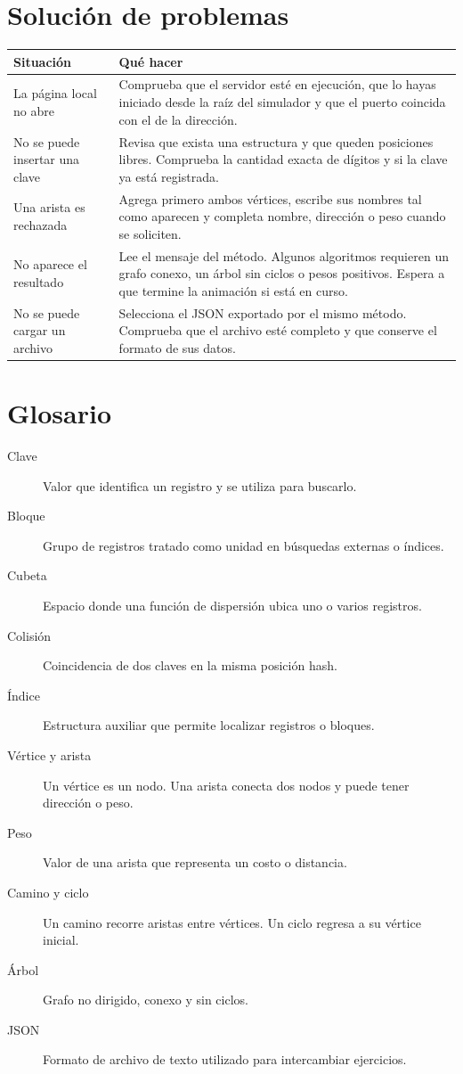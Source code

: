 \documentclass[11pt,a4paper]{report}
\begin{document}
\chapter{Solución de problemas}
\begin{tabularx}{\linewidth}{@{}p{.32\linewidth}X@{}}
\toprule
Situación & Qué hacer \\
\midrule
La página local no abre & Comprueba que el servidor esté en ejecución, que lo hayas iniciado desde la raíz del simulador y que el puerto coincida con el de la dirección. \\
No se puede insertar una clave & Revisa que exista una estructura y que queden posiciones libres. Comprueba la cantidad exacta de dígitos y si la clave ya está registrada. \\
Una arista es rechazada & Agrega primero ambos vértices, escribe sus nombres tal como aparecen y completa nombre, dirección o peso cuando se soliciten. \\
No aparece el resultado & Lee el mensaje del método. Algunos algoritmos requieren un grafo conexo, un árbol sin ciclos o pesos positivos. Espera a que termine la animación si está en curso. \\
No se puede cargar un archivo & Selecciona el JSON exportado por el mismo método. Comprueba que el archivo esté completo y que conserve el formato de sus datos. \\
\bottomrule
\end{tabularx}

\chapter{Glosario}
\begin{description}
\item[Clave] Valor que identifica un registro y se utiliza para buscarlo.
\item[Bloque] Grupo de registros tratado como unidad en búsquedas externas o índices.
\item[Cubeta] Espacio donde una función de dispersión ubica uno o varios registros.
\item[Colisión] Coincidencia de dos claves en la misma posición hash.
\item[Índice] Estructura auxiliar que permite localizar registros o bloques.
\item[Vértice y arista] Un vértice es un nodo. Una arista conecta dos nodos y puede tener dirección o peso.
\item[Peso] Valor de una arista que representa un costo o distancia.
\item[Camino y ciclo] Un camino recorre aristas entre vértices. Un ciclo regresa a su vértice inicial.
\item[Árbol] Grafo no dirigido, conexo y sin ciclos.
\item[JSON] Formato de archivo de texto utilizado para intercambiar ejercicios.
\end{description}
\end{document}
